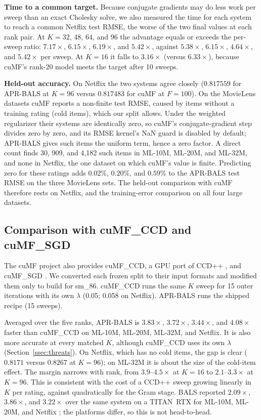 \textbf{Time to a common target.} Because conjugate gradients may do less work per sweep than an exact Cholesky solve, we also measured the time for each system to reach a common Netflix test RMSE, the worse of the two final values at each rank pair. At $K = 32$, 48, 64, and 96 the advantage equals or exceeds the per-sweep ratio: $7.17\times$, $6.15\times$, $6.19\times$, and $5.42\times$, against $5.38\times$, $6.15\times$, $4.64\times$, and $5.42\times$ per sweep. At $K{=}16$ it falls to $3.16\times$ (versus $6.33\times$), because cuMF's rank-20 model meets the target after 10 sweeps.

\textbf{Held-out accuracy.} On Netflix the two systems agree closely ($0.817559$ for APR-BALS at $K=96$ versus $0.817483$ for cuMF at $F=100$). On the MovieLens datasets cuMF reports a non-finite test RMSE, caused by items without a training rating (cold items), which our split allows. Under the weighted regularizer their systems are identically zero, so cuMF's conjugate-gradient step divides zero by zero, and its RMSE kernel's NaN guard is disabled by default; APR-BALS gives such items the uniform term, hence a zero factor. A direct count finds 30, 909, and 4{,}182 such items in ML-10M, ML-20M, and ML-32M, and none in Netflix, the one dataset on which cuMF's value is finite. Predicting zero for these ratings adds $0.02\%$, $0.20\%$, and $0.59\%$ to the APR-BALS test RMSE on the three MovieLens sets. The held-out comparison with cuMF therefore rests on Netflix, and the training-error comparison on all four large datasets.

\subsection{Comparison with cuMF\_CCD and cuMF\_SGD}
\label{ssec:ccdsgd}

The cuMF project also provides cuMF\_CCD, a GPU port of CCD++ \cite{yu2012scalable,nisa2017parallel}, and cuMF\_SGD \cite{xie2017cumf}. We converted each frozen split to their input formats and modified them only to build for sm\_86. cuMF\_CCD runs the same $K$ sweep for 15 outer iterations with its own $\lambda$ (0.05; 0.058 on Netflix). APR-BALS runs the shipped recipe (15 sweeps).

Averaged over the five ranks, APR-BALS is $3.83\times$, $3.72\times$, $3.44\times$, and $4.08\times$ faster than cuMF\_CCD on ML-10M, ML-20M, ML-32M, and Netflix. It is also more accurate at every matched $K$, although cuMF\_CCD uses its own $\lambda$ (Section~\ref{ssec:threats}). On Netflix, which has no cold items, the gap is clear ($0.8171$ versus $0.8267$ at $K=96$); on ML-32M it is about the size of the cold-item effect. The margin narrows with rank, from $3.9$--$4.5\times$ at $K=16$ to $2.1$--$3.3\times$ at $K=96$. This is consistent with the cost of a CCD++ sweep growing linearly in $K$ per rating, against quadratically for the Gram stage. BALS reported $2.09\times$, $3.86\times$, and $3.22\times$ over the same system on a TITAN~RTX for ML-10M, ML-20M, and Netflix \cite{chen2021bals}; the platforms differ, so this is not head-to-head.

